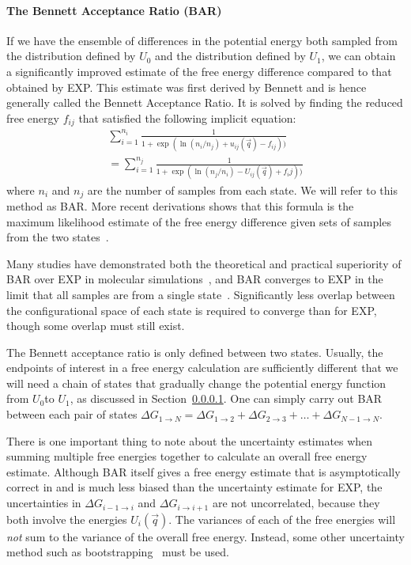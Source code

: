 \documentclass[9pt,bestpractices]{livecoms}
\begin{document}
\paragraph{The Bennett Acceptance Ratio (BAR)}

If we have the ensemble of differences in the potential energy both sampled from the distribution defined by $U_0$ and the distribution defined by $U_1$, we can obtain a significantly improved estimate of the
free energy difference compared to that obtained by EXP.  
This estimate was first derived by Bennett and is hence generally called the Bennett Acceptance Ratio.  It is solved by finding the reduced free energy $f_{ij}$ that satisfied the following implicit equation:
\begin{eqnarray}
 \sum_{i=1}^{n_i} \frac{1}{1 + \exp(\ln(n_i/n_j) + u_{ij}(\vec{q}) - f_{ij}))} \\
 =\sum_{i=1}^{n_j} \frac{1}{1 + \exp(\ln(n_j/n_i) - U_{ij}(\vec{q}) + f_ij))} 
\end{eqnarray}
where $n_i$ and $n_j$ are the number of samples from each state. We
will refer to this method as BAR. More recent derivations shows that this formula is the maximum likelihood estimate of the free energy difference
given sets of samples from the two states~\cite{shirts.bennett}. 

Many studies have demonstrated both the
theoretical and practical superiority of BAR over EXP in molecular
simulations~\cite{shirts2005comparison,lu2003appropriate}, and BAR converges to EXP in the limit that all samples are from a
single state~\cite{bennett1976efficient,shirts.bennett}. Significantly less
overlap between the configurational space of each state is required to
converge than for EXP, though some overlap must still exist.

The Bennett acceptance ratio is only defined between two states.  Usually, the endpoints of interest in a free energy calculation are sufficiently different that we will need a chain of states that gradually change the potential energy function from $U_0$to $U_1$, as discussed in Section~\ref{}. One can simply carry out BAR between each pair of states $\Delta G_{1 \rightarrow N} = \Delta {G_{1\rightarrow 2}} + \Delta {G_{2\rightarrow 3}} +  \ldots + \Delta G_{N-1\rightarrow N}$.

There is one important thing to note about the uncertainty estimates when summing multiple free energies together to calculate an overall free energy estimate.  Although BAR itself gives a free energy estimate that is asymptotically correct in and is much less biased than the uncertainty estimate for EXP, the uncertainties in $\Delta {G_{i-1\rightarrow i}}$ and $\Delta {G_{i\rightarrow i+1}}$ are not uncorrelated, because they both involve the energies $U_i(\vec{q})$. The variances of each of the free energies will \textit{not} sum to the variance of the overall free energy. Instead, some other uncertainty method such as bootstrapping~\cite{???} must be used.
\end{document}
